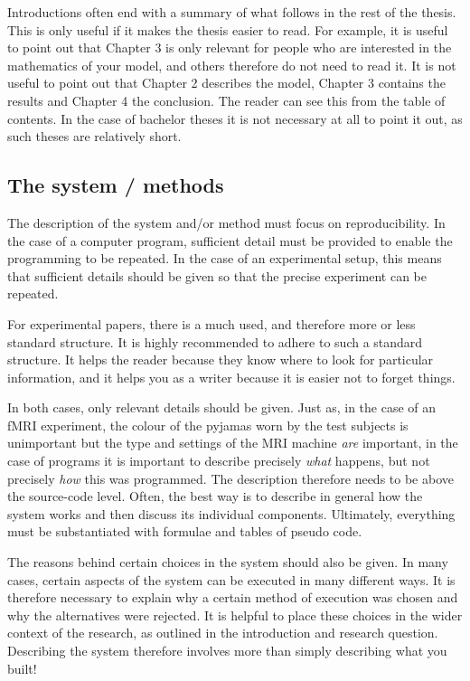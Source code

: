 Introductions often end with a summary of what follows in the rest of the thesis. This is only useful if it makes the thesis easier to read. For example, it is useful to point out that Chapter 3 is only relevant for people who are interested in the mathematics of your model, and others therefore do not need to read it. It is not useful to point out that Chapter 2 describes the model, Chapter 3 contains the results and Chapter 4 the conclusion. The reader can see this from the table of contents. In the case of bachelor theses it is not necessary at all to point it out, as such theses are relatively short.

\subsection{The system / methods}\label{sec:_system_methods}
The description of the system and/or method must focus on reproducibility. In the case of a computer program, sufficient detail must be provided to enable the programming to be repeated. In the case of an experimental setup, this means that sufficient details should be given so that the precise experiment can be repeated. 

For experimental papers, there is a much used, and therefore more or less standard structure. It is  highly recommended to adhere to such a standard structure. It helps the reader because they know where to look for particular information, and it helps you as a writer because it is easier not to forget things.

In both cases, only relevant details should be given. Just as, in the case of an fMRI experiment, the colour of the pyjamas worn by the test subjects is unimportant but the type and settings of the MRI machine \textit{are} important, in the case of programs it is important to describe precisely \textit{what} happens, but not precisely \textit{how} this was programmed. The description therefore needs to be above the source-code level.  Often, the best way is to describe in general how the system works and then discuss its individual components. Ultimately, everything must be substantiated with formulae and tables of pseudo code.

The reasons behind certain choices in the system should also be given. In many cases, certain aspects of the system can be executed in many different ways. It is therefore necessary to explain why a certain method of execution was chosen and why the alternatives were rejected. It is helpful to place these choices in the wider context of the research, as outlined in the introduction and research question. Describing the system therefore involves more than simply describing what you built!

